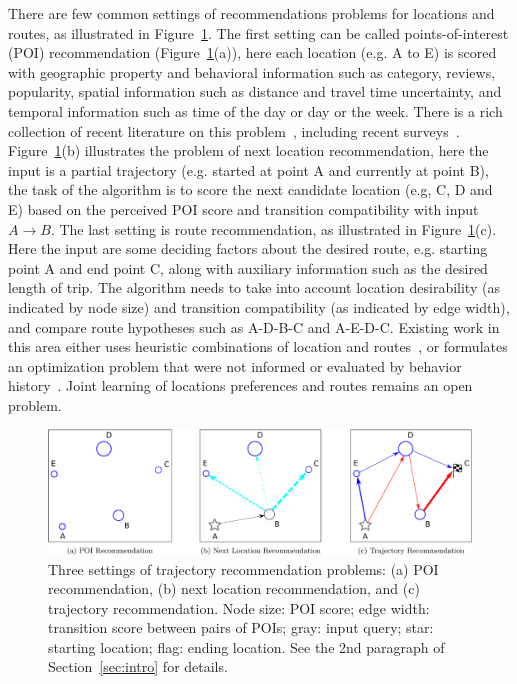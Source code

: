 There are few common settings of recommendations problems for locations and routes, as illustrated in Figure~\ref{fig:threesettings}. 
The first setting can be called points-of-interest (POI) recommendation (Figure~\ref{fig:threesettings}(a)), here each location (e.g. A to E) is scored with geographic property and behavioral information such as category, reviews, popularity, spatial information such as distance and travel time uncertainty, and temporal information such as time of the day or day or the week.  There is a rich collection of recent literature on this problem~\cite{bao2015recommendations,yin2015joint,shi2011personalized,lian2014geomf,liu2014exploiting,yuan2013timeaware,hsieh2014mining,gao2013temporal,yuan2014graph}, including recent surveys~\cite{bao2015recommendations,zheng2014urban}. 
Figure~\ref{fig:threesettings}(b) illustrates the problem of next location recommendation\cite{ijcai13,aaai16,baraglia2013learnext,zhang2015location}, here the input is a partial trajectory (e.g. started at point A and currently at point B), the task of the algorithm is to score the next candidate location (e.g, C, D and E) based on the perceived POI score and transition compatibility with input $A\rightarrow B$. 
    The last setting is route recommendation, as illustrated in Figure~\ref{fig:threesettings}(c). Here the input are some deciding factors about the desired route, e.g. starting point A and end point C, along with auxiliary information such as the desired length of trip. The algorithm needs to take into account location desirability (as indicated by node size) and transition compatibility (as indicated by edge width), and compare route hypotheses such as A-D-B-C and A-E-D-C. Existing work in this area either uses heuristic combinations of location and routes~\cite{ijcai15,lu2012personalized}, or formulates an optimization problem that were not informed or evaluated by behavior history~\cite{gioniswsdm14,chen2015tripplanner}. Joint learning of locations preferences and routes remains an open problem.

\begin{figure}[t]
	\centering
	\includegraphics[width=\textwidth]{fig/fig1-flavours.pdf}
	\caption{Three settings of trajectory recommendation problems: (a) POI recommendation, (b) next location recommendation, and (c) trajectory recommendation. Node size: POI score; edge width: transition score between pairs of POIs; gray: input query; star: starting location; flag: ending location. See the 2nd paragraph of Section~\ref{sec:intro} for details.
}
	\label{fig:threesettings}
\end{figure}


